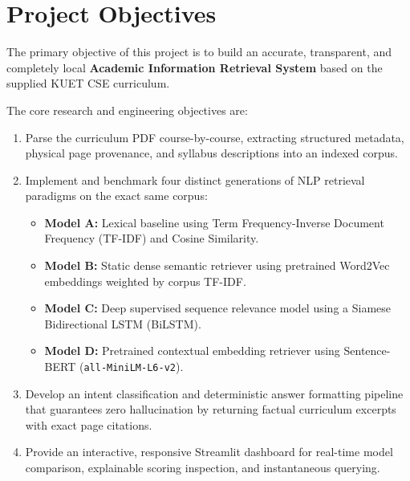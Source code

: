 \documentclass[12pt,a4paper]{report}
\begin{document}
\section{Project Objectives}
The primary objective of this project is to build an accurate, transparent, and completely local \textbf{Academic Information Retrieval System} based on the supplied KUET CSE curriculum. 

The core research and engineering objectives are:
\begin{enumerate}
    \item Parse the curriculum PDF course-by-course, extracting structured metadata, physical page provenance, and syllabus descriptions into an indexed corpus.
    \item Implement and benchmark four distinct generations of NLP retrieval paradigms on the exact same corpus:
    \begin{itemize}
        \item \textbf{Model A:} Lexical baseline using Term Frequency-Inverse Document Frequency (TF-IDF) and Cosine Similarity.
        \item \textbf{Model B:} Static dense semantic retriever using pretrained Word2Vec embeddings weighted by corpus TF-IDF.
        \item \textbf{Model C:} Deep supervised sequence relevance model using a Siamese Bidirectional LSTM (BiLSTM).
        \item \textbf{Model D:} Pretrained contextual embedding retriever using Sentence-BERT (\texttt{all-MiniLM-L6-v2}).
    \end{itemize}
    \item Develop an intent classification and deterministic answer formatting pipeline that guarantees zero hallucination by returning factual curriculum excerpts with exact page citations.
    \item Provide an interactive, responsive Streamlit dashboard for real-time model comparison, explainable scoring inspection, and instantaneous querying.
\end{enumerate}
\end{document}
